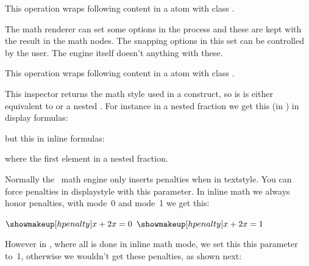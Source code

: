 \startoldprimitive[title={\prm {mathopen}}]

This operation wraps following content in a atom with class .

\stopoldprimitive

\startnewprimitive[title={\prm {mathoptions}}]

The math renderer can set some options in the process and these are kept with the
result in the math nodes. The snapping options in this set can be controlled by
the user. The engine itself doesn't anything with these.

\startcolumns[n=2]
\stopcolumns

\stopnewprimitive

\startoldprimitive[title={\prm {mathord}}]

This operation wraps following content in a atom with class .

\stopoldprimitive

\startnewprimitive[title={\prm {mathparentstyle}}]

This inspector returns the math style used in a construct, so is is either
equivalent to  or a nested . For instance
in a nested fraction we get this (in \CONTEXT) in display formulas:

\def\foo{(\the\mathmainstyle,\the\mathparentstyle,\the\mathstyle)}

\dm{
    \frac{\frac{\foo}{\foo}}{\frac{\foo}{\foo}} + \foo
}

but this in inline formulas:

\im{
    \frac{\frac{\foo}{\foo}}{\frac{\foo}{\foo}} + \foo
}

where the first element in a nested fraction.

\stopnewprimitive

\startnewprimitive[title={\prm {mathpenaltiesmode}}]

Normally the \TEX\ math engine only inserts penalties when in textstyle. You can
force penalties in displaystyle with this parameter. In inline math we always
honor penalties, with mode~0 and mode~1 we get this:

\pushoverloadmode

\startlines
{ \let\mathpenaltiesmode\scratchcounter $\showmakeup[hpenalty]x+2x=0$}
{ \let\mathpenaltiesmode\scratchcounter $\showmakeup[hpenalty]x+2x=1$}
\stoplines

However in \CONTEXT, where all is done in inline math mode, we set this this
parameter to~1, otherwise we wouldn't get these penalties, as shown next:

